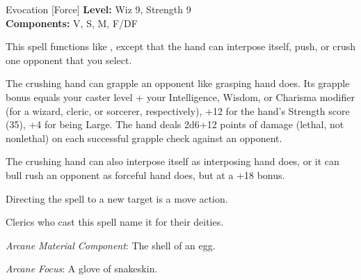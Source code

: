 {Evocation [Force]}
{
	\textbf{Level:}
	Wiz 9, Strength 9\\
	\textbf{Components:}
	V, S, M, F/DF\\
}
{
	This spell functions like , except that the hand can interpose itself, push, or crush one opponent that you select.

	The crushing hand can grapple an opponent like grasping hand does. Its grapple bonus equals your caster level + your Intelligence, Wisdom, or Charisma modifier (for a wizard, cleric, or sorcerer, respectively), +12 for the hand's Strength score (35), +4 for being Large. The hand deals 2d6+12 points of damage (lethal, not nonlethal) on each successful grapple check against an opponent.

	The crushing hand can also interpose itself as interposing hand does, or it can bull rush an opponent as forceful hand does, but at a +18 bonus.

	Directing the spell to a new target is a move action.

Clerics who cast this spell name it for their deities.

	\textit{Arcane Material Component}:
	The shell of an egg.

	\textit{Arcane Focus}:
	A glove of snakeskin.

}

